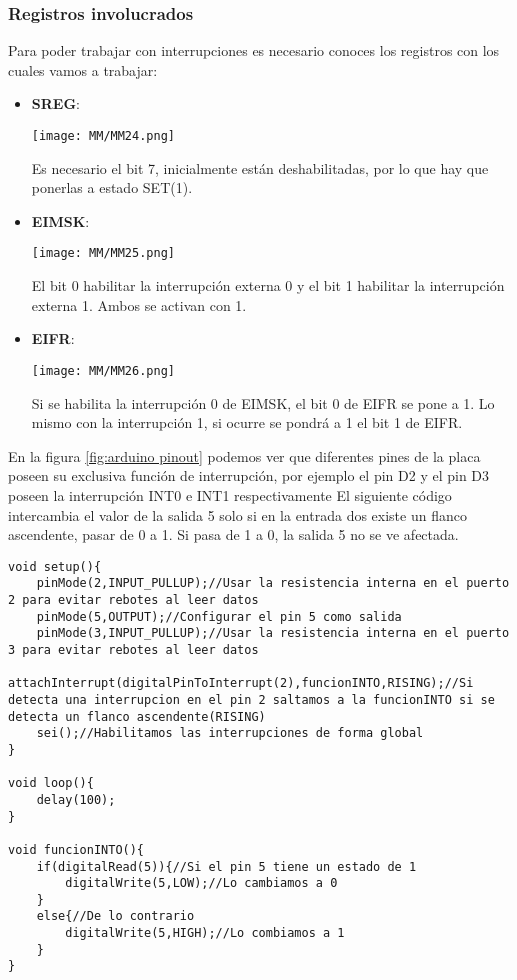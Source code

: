 \documentclass[
	12pt, %
	fleqn, %
	a4paper, %
	oneside, %
]{LegrandOrangeBook}
\begin{document}
\subsubsection{Registros involucrados}
Para poder trabajar con interrupciones es necesario conoces los registros con los cuales vamos a trabajar:
\begin{itemize}
\item \textbf{SREG}:
\begin{center}
\texttt{[image: MM/MM24.png]}
\end{center}
Es necesario el bit 7, inicialmente están deshabilitadas, por lo que hay que ponerlas a estado SET(1).
\item \textbf{EIMSK}:
\begin{center}
\texttt{[image: MM/MM25.png]}
\end{center}
El bit 0 habilitar la interrupción externa 0 y el bit 1 habilitar la interrupción externa 1. Ambos se activan con 1.
\item \textbf{EIFR}:
\begin{center}
\texttt{[image: MM/MM26.png]}
\end{center}
Si se habilita la interrupción 0 de EIMSK, el bit 0 de EIFR se pone a 1. Lo mismo con la interrupción 1, si ocurre se pondrá a 1 el bit 1 de EIFR.
\end{itemize}
En la figura \ref{fig:arduino pinout} podemos ver que diferentes pines de la placa poseen su exclusiva función de interrupción, por ejemplo el pin D2 y el pin D3 poseen la interrupción INT0 e INT1 respectivamente
El siguiente código intercambia el valor de la salida 5 solo si en la entrada dos existe un flanco ascendente, pasar de 0 a 1. Si pasa de 1 a 0, la salida 5 no se ve afectada.
\begin{lstlisting}[language=Arduino,caption={Interrupción flanco ascendente}]
void setup(){
	pinMode(2,INPUT_PULLUP);//Usar la resistencia interna en el puerto 2 para evitar rebotes al leer datos
	pinMode(5,OUTPUT);//Configurar el pin 5 como salida
	pinMode(3,INPUT_PULLUP);//Usar la resistencia interna en el puerto 3 para evitar rebotes al leer datos
			attachInterrupt(digitalPinToInterrupt(2),funcionINTO,RISING);//Si detecta una interrupcion en el pin 2 saltamos a la funcionINTO si se detecta un flanco ascendente(RISING)
	sei();//Habilitamos las interrupciones de forma global
}	

void loop(){
	delay(100);
}

void funcionINTO(){
	if(digitalRead(5)){//Si el pin 5 tiene un estado de 1
		digitalWrite(5,LOW);//Lo cambiamos a 0
	}
	else{//De lo contrario
		digitalWrite(5,HIGH);//Lo combiamos a 1
	}
}
\end{lstlisting}
\end{document}
